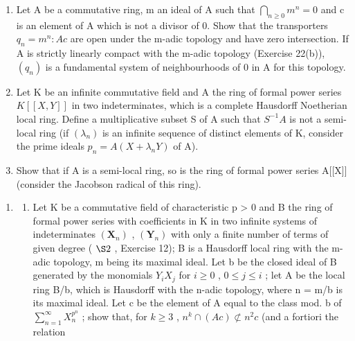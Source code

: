 \begin{enumerate}
\def\labelenumi{\arabic{enumi}.}
\setcounter{enumi}{28}
\item
  Let A be a commutative ring, m an ideal of A such that \(\bigcap_{n\geq0}m^{n}=0\) and c is an element of A which is not a divisor of 0. Show that the transporters \(q_{n}=m^{n}:Ac\) are open under the m-adic topology and have zero intersection. If A is strictly linearly compact with the m-adic topology (Exercise 22(b)), \((q_{n})\) is a fundamental system of neighbourhoods of 0 in A for this topology.
\item
  Let K be an infinite commutative field and A the ring of formal power series \(K[[X,Y]]\) in two indeterminates, which is a complete Hausdorff Noetherian local ring. Define a multiplicative subset S of A such that \(S^{-1}A\) is not a semi-local ring (if \((\lambda_{n})\) is an infinite sequence of distinct elements of K, consider the prime ideals \(p_{n}=A(X+\lambda_{n}Y)\) of A).
\item
  Show that if A is a semi-local ring, so is the ring of formal power series A{[}{[}X{]}{]} (consider the Jacobson radical of this ring).
\end{enumerate}


\begin{enumerate}
\def\labelenumi{\arabic{enumi}.}
\tightlist
\item
  \begin{enumerate}
  \def\labelenumii{(\alph{enumii})}
  \tightlist
  \item
    Let K be a commutative field of characteristic p \textgreater{} 0 and B the ring of formal power series with coefficients in K in two infinite systems of indeterminates \((\mathbf{X}_{n})\) , \((\mathbf{Y}_{n})\) with only a finite number of terms of given degree ( \(\S 2\) , Exercise 12); B is a Hausdorff local ring with the m-adic topology, m being its maximal ideal. Let b be the closed ideal of B generated by the monomials \(Y_{i}X_{j}\) for \(i \geqslant 0\) , \(0 \leqslant j \leqslant i\) ; let A be the local ring B/b, which is Hausdorff with the n-adic topology, where n = m/b is its maximal ideal. Let c be the element of A equal to the class mod. b of \(\sum_{n=1}^{\infty} X_{n}^{p^{n}}\) ; show that, for \(k \geqslant 3\) , \(n^{k} \cap (Ac) \not\subset n^{2}c\) (and a fortiori the relation
  \end{enumerate}
\end{enumerate}

